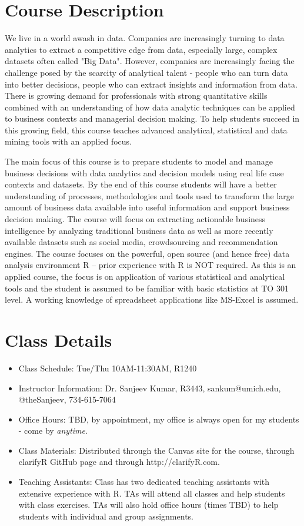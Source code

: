 \documentclass[11pt, letterpaper, twoside]{memoir}\usepackage{knitr}
\begin{document}
\vspace{12pt}


\section{Course Description}

We live in a world awash in data. Companies are increasingly turning to data analytics to extract a competitive edge from data, especially large, complex datasets often called "Big Data". However, companies are increasingly facing the challenge posed by the scarcity of analytical talent - people who can turn data into better decisions, people who can extract insights and information from data. There is growing demand for professionals with strong quantitative skills combined with an understanding of how data analytic techniques can be applied to business contexts and managerial decision making. To help students succeed in this growing field, this course teaches advanced analytical, statistical and data mining tools with an applied focus. 

The main focus of this course is to prepare students to model and manage business decisions with data analytics and decision models using real life case contexts and datasets.  By the end of this course students will have a better understanding of processes, methodologies and tools used to transform the large amount of business data available into useful information and support business decision making. The course will focus on extracting actionable business intelligence by analyzing traditional business data as well as more recently available datasets such as social media, crowdsourcing and recommendation engines. The course focuses on the powerful, open source (and hence free) data analysis environment R – prior experience with R is NOT required. As this is an applied course, the focus is on application of various statistical and analytical tools and the student is assumed to be familiar with basic statistics at TO 301 level. A working knowledge of spreadsheet applications like MS-Excel is assumed.


\section{Class Details}
\begin{itemize}
\item Class Schedule: Tue/Thu 10AM-11:30AM, R1240
\item Instructor Information: Dr. Sanjeev Kumar, R3443, sankum@umich.edu, @theSanjeev, 734-615-7064
\item Office Hours: TBD, by appointment, my office is always open for my students - come by \emph{anytime}.
\item Class Materials: Distributed through the Canvas site for the course, through clarifyR GitHub page and through http://clarifyR.com.
\item Teaching Assistants: Class has two dedicated teaching assistants with extensive experience with R. TAs will attend all classes and help students with class exercises. TAs will also hold office hours (times TBD) to help students with individual and group assignments.
\end{itemize}
\end{document}

